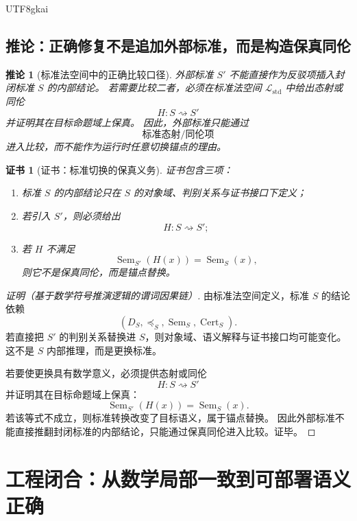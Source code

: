 \documentclass[12pt]{article}
\newtheorem{corollary}{推论}[section]
\newtheorem{Certificate}{证书}[section]
\newcommand{\Std}{\mathcal L_{\mathrm{std}}}
\newcommand{\Sem}{\operatorname{Sem}}
\newcommand{\Cert}{\operatorname{Cert}}
\begin{document}
\begin{CJK*}{UTF8}{gkai}
\subsection{推论：正确修复不是追加外部标准，而是构造保真同伦}
\label{subsec:tex51-standard-homotopy-corollary}

\begin{corollary}[标准法空间中的正确比较口径]
\label{cor:tex51-standard-homotopy}
外部标准 \(S'\) 不能直接作为反驳项插入封闭标准 \(S\) 的内部结论。
若需要比较二者，必须在标准法空间 \(\Std\) 中给出态射或同伦
\[
  H:S\rightsquigarrow S'
\]
并证明其在目标命题域上保真。
因此，外部标准只能通过
\[
  \text{标准态射/同伦项}
\]
进入比较，而不能作为运行时任意切换锚点的理由。
\end{corollary}

\begin{Certificate}[证书：标准切换的保真义务]
\label{cert:tex51-standard-homotopy}
证书包含三项：
\begin{enumerate}
  \item 标准 \(S\) 的内部结论只在 \(S\) 的对象域、判别关系与证书接口下定义；
  \item 若引入 \(S'\)，则必须给出
  \[
    H:S\rightsquigarrow S';
  \]
  \item 若 \(H\) 不满足
  \[
    \Sem_{S'}(H(x))=\Sem_S(x),
  \]
  则它不是保真同伦，而是锚点替换。
\end{enumerate}
\end{Certificate}

\begin{proof}[证明（基于数学符号推演逻辑的谓词因果链）]
由标准法空间定义，标准 \(S\) 的结论依赖
\[
  (D_S,\preceq_S,\Sem_S,\Cert_S).
\]
若直接把 \(S'\) 的判别关系替换进 \(S\)，则对象域、语义解释与证书接口均可能变化。
这不是 \(S\) 内部推理，而是更换标准。

若要使更换具有数学意义，必须提供态射或同伦
\[
  H:S\rightsquigarrow S'
\]
并证明其在目标命题域上保真：
\[
  \Sem_{S'}(H(x))=\Sem_S(x).
\]
若该等式不成立，则标准转换改变了目标语义，属于锚点替换。
因此外部标准不能直接推翻封闭标准的内部结论，只能通过保真同伦进入比较。证毕。
\end{proof}

\clearpage

\section{工程闭合：从数学局部一致到可部署语义正确}
\label{sec:tex51-engineering}


\end{CJK*}
\end{document}
